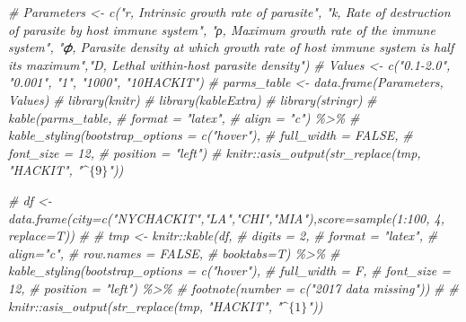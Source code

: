 \documentclass[
]{article}
\newenvironment{Shaded}{\begin{snugshade}}{\end{snugshade}}
\newcommand{\CommentTok}[1]{\textcolor[rgb]{0.56,0.35,0.01}{\textit{#1}}}
\begin{document}
\begin{Shaded}
\begin{Highlighting}[]
\CommentTok{\# Parameters \textless{}{-} c("r, Intrinsic growth rate of parasite", "k, Rate of destruction of parasite by host immune system", "ρ, Maximum growth rate of the immune system", "𝜙, Parasite density at which growth rate of host immune system is half its maximum","D, Lethal within{-}host parasite density")}
\CommentTok{\# Values \textless{}{-} c("0.1{-}2.0", "0.001", "1", "1000", "10HACKIT")}
\CommentTok{\# parms\_table \textless{}{-} data.frame(Parameters, Values)}
\CommentTok{\# library(knitr)}
\CommentTok{\# library(kableExtra)}
\CommentTok{\# library(stringr)}
\CommentTok{\# kable(parms\_table, }
\CommentTok{\#       format = "latex",}
\CommentTok{\#       align = "c") \%\textgreater{}\% }
\CommentTok{\#   kable\_styling(bootstrap\_options = c("hover"),}
\CommentTok{\#                 full\_width = FALSE,}
\CommentTok{\#                 font\_size = 12, }
\CommentTok{\#                 position = "left")}
\CommentTok{\# knitr::asis\_output(str\_replace(tmp, "HACKIT", "$\^{}\{9\}$"))}
\end{Highlighting}
\end{Shaded}

\begin{Shaded}
\begin{Highlighting}[]
\CommentTok{\# df \textless{}{-} data.frame(city=c("NYCHACKIT","LA","CHI","MIA"),score=sample(1:100, 4, replace=T))}
\CommentTok{\# }
\CommentTok{\# tmp \textless{}{-} knitr::kable(df,  }
\CommentTok{\#       digits = 2,}
\CommentTok{\#       format = "latex",}
\CommentTok{\#       align="c",}
\CommentTok{\#       row.names = FALSE,}
\CommentTok{\#       booktabs=T) \%\textgreater{}\%}
\CommentTok{\#   kable\_styling(bootstrap\_options = c("hover"),}
\CommentTok{\#                 full\_width = F,}
\CommentTok{\#                 font\_size = 12,}
\CommentTok{\#                 position = "left") \%\textgreater{}\%}
\CommentTok{\#   footnote(number = c("2017 data missing"))}
\CommentTok{\# }
\CommentTok{\# knitr::asis\_output(str\_replace(tmp, "HACKIT", "$\^{}\{1\}$"))}
\end{Highlighting}
\end{Shaded}
\end{document}
